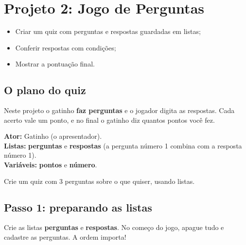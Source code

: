 \chapter{Projeto 2: Jogo de Perguntas}

\begin{objetivos}
\begin{itemize}
\item Criar um quiz com perguntas e respostas guardadas em listas;
\item Conferir respostas com condições;
\item Mostrar a pontuação final.
\end{itemize}
\end{objetivos}

\section{O plano do quiz}

Neste projeto o gatinho \textbf{faz perguntas} e o jogador digita as respostas. Cada acerto vale um ponto, e no final o gatinho diz quantos pontos você fez.

\begin{definicao}
\textbf{Ator:} Gatinho (o apresentador).\\
\textbf{Listas:} \textbf{perguntas} e \textbf{respostas} (a pergunta número 1 combina com a resposta número 1).\\
\textbf{Variáveis:} \textbf{pontos} e \textbf{número}.
\end{definicao}

\begin{missao}
Crie um quiz com 3 perguntas sobre o que quiser, usando listas.
\end{missao}

\section{Passo 1: preparando as listas}

Crie as listas \textbf{perguntas} e \textbf{respostas}. No começo do jogo, apague tudo e cadastre as perguntas. A ordem importa!

\begin{codigo}
\begin{pilha}
\end{pilha}
\end{codigo}

